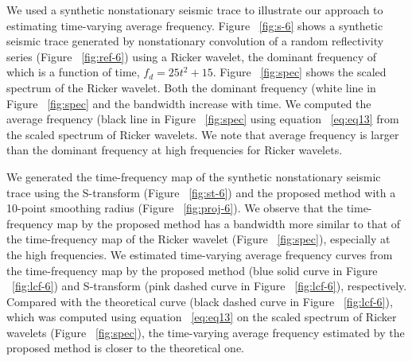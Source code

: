 



We used a synthetic nonstationary seismic trace to illustrate our
approach to estimating time-varying average frequency. Figure ~\ref{fig:s-6}
shows a synthetic seismic trace generated by nonstationary convolution
\cite[]{Margrave1998} of a random reflectivity series (Figure ~\ref{fig:ref-6})
using a Ricker wavelet, the dominant frequency of which is a function
of time, $f_{d}=25t^{2}+15$. Figure ~\ref{fig:spec} shows the scaled spectrum
of the Ricker wavelet. Both the dominant frequency (white line in
Figure ~\ref{fig:spec} and the bandwidth increase with time. We computed the
average frequency (black line in Figure ~\ref{fig:spec} using equation ~\ref{eq:eq13} from
the scaled spectrum of Ricker wavelets. We note that average
frequency is larger than the dominant frequency at high frequencies
for Ricker wavelets.

We generated the time-frequency map of the synthetic nonstationary
seismic trace using the S-transform (Figure ~\ref{fig:st-6}) and
the proposed method with a 10-point smoothing radius (Figure ~\ref{fig:proj-6}).
We observe that the time-frequency map by the proposed method
has a bandwidth more similar to that of the time-frequency map of
the Ricker wavelet (Figure ~\ref{fig:spec}), especially at the high frequencies.
We estimated time-varying average frequency curves from the
time-frequency map by the proposed method (blue solid curve in
Figure ~\ref{fig:lcf-6}) and S-transform (pink dashed curve in Figure ~\ref{fig:lcf-6}), respectively.
Compared with the theoretical curve (black dashed curve in
Figure ~\ref{fig:lcf-6}), which was computed using equation ~\ref{eq:eq13} on the scaled
spectrum of Ricker wavelets (Figure ~\ref{fig:spec}), the time-varying average
frequency estimated by the proposed method is closer to the
theoretical one.

